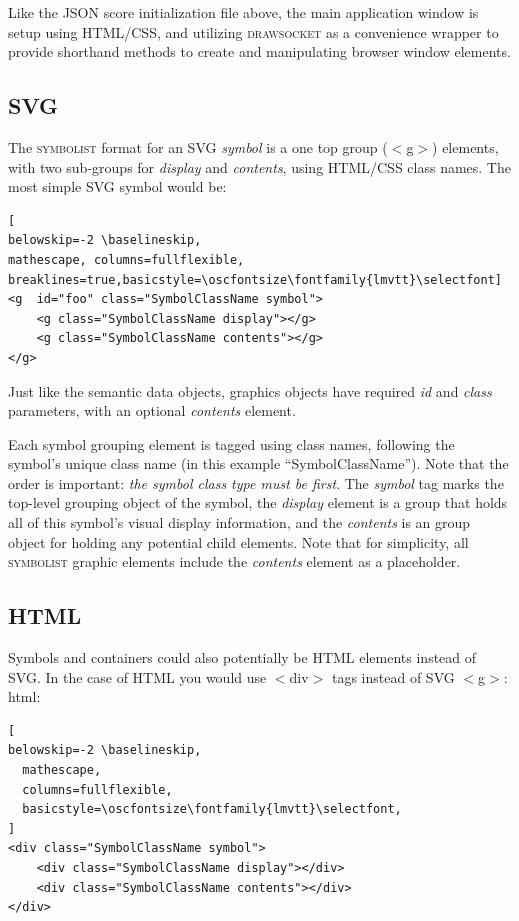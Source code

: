 \documentclass{article}
\def\symbolist{\textsc{symbolist}\xspace}
\def\drawsocket{\textsc{drawsocket}\xspace}
\def\oscfontsize{\tiny}
\begin{document}
Like the JSON score initialization file above, the main application window is setup using HTML/CSS, and utilizing \drawsocket as a convenience wrapper to provide shorthand methods to create and manipulating browser window elements. 

\subsection{SVG}

The \symbolist format for an SVG \textit{symbol} is a one top group ($<$g$>$) elements, with two sub-groups for \textit{display} and \textit{contents}, using HTML/CSS class names. The most simple SVG symbol would be:

\begin{lstlisting}[
belowskip=-2 \baselineskip,
mathescape, columns=fullflexible, breaklines=true,basicstyle=\oscfontsize\fontfamily{lmvtt}\selectfont]
<g  id="foo" class="SymbolClassName symbol">
    <g class="SymbolClassName display"></g>
    <g class="SymbolClassName contents"></g>
</g>
\end{lstlisting}


Just like the semantic data objects, graphics objects have required \textit{id} and \textit{class} parameters, with an optional \textit{contents} element.

Each symbol grouping element is tagged using class names, following the symbol's unique class name (in this example ``SymbolClassName''). Note that the order is important: \textit{the symbol class type must be first}. The \textit{symbol} tag marks the top-level grouping object of the symbol, the \textit{display} element is a group that holds all of this symbol's visual display information, and the \textit{contents} is an group object for holding any potential child elements. Note that for simplicity, all \symbolist graphic elements include the \textit{contents} element as a placeholder.

\subsection{HTML}

Symbols and containers could also potentially be HTML elements instead of SVG. In the case of HTML you would use $<$div$>$ tags instead of SVG $<$g$>$:
html:

\begin{lstlisting}[
belowskip=-2 \baselineskip,
  mathescape,
  columns=fullflexible,
  basicstyle=\oscfontsize\fontfamily{lmvtt}\selectfont,
]
<div class="SymbolClassName symbol">
    <div class="SymbolClassName display"></div>
    <div class="SymbolClassName contents"></div>
</div>
\end{lstlisting}
\end{document}

